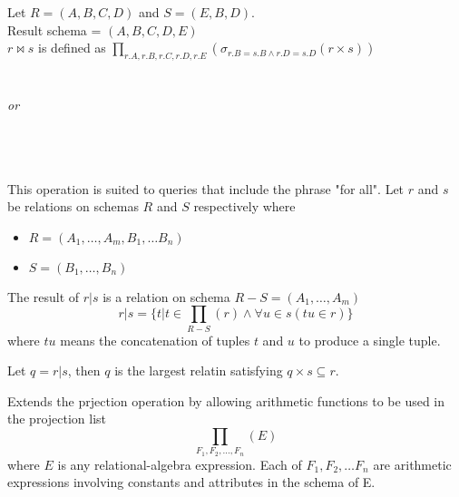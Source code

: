 \documentclass{article}
\begin{document}
\begin{example}
  Let $R = (A,B,C,D)$ and $S = (E,B,D)$. \\ 
  Result schema = $(A,B,C,D,E)$ \\ 
  $r \bowtie s$ is defined as $\prod_{r.A,r.B,r.C,r.D,r.E}(\sigma_{r.B = s.B \wedge r.D = s.D}(r \times s))$ \\ 

   \\ 
   \\ 

  \emph{or} \\ 

   \\ 
   \\ 
   \\ 
\end{example}

\begin{definition}
  This operation is suited to queries that include the phrase "for all". Let $r$ and $s$ be relations on schemas $R$ and $S$ respectively where 
  \begin{itemize}
    \item $R = (A_1 , \dots , A_m , B_1 , \dots B_n)$ 
    \item $S = (B_1 , \dots , B_n)$
  \end{itemize}
  The result of $r \vert s$ is a relation on schema $R - S = (A_1 , \dots , A_m)$ $$r \vert s = \{t \vert t \in \prod_{R-S}(r) \wedge \forall u \in s (tu \in r)\}$$ where $tu$ means the concatenation of tuples $t$ and $u$ to produce a single tuple.
\end{definition}

\begin{remark}
  Let $q = r \vert s$, then $q$ is the largest relatin satisfying $q \times s \subseteq r$. 
\end{remark}

\begin{definition}
  Extends the prjection operation by allowing arithmetic functions to be used in the projection list $$\prod_{F_1 , F_2 , \dots , F_n}(E)$$ where $E$ is any relational-algebra expression. Each of $F_1 , F_2, \dots F_n$ are arithmetic expressions involving constants and attributes in the schema of E. 
\end{definition}
\end{document}
